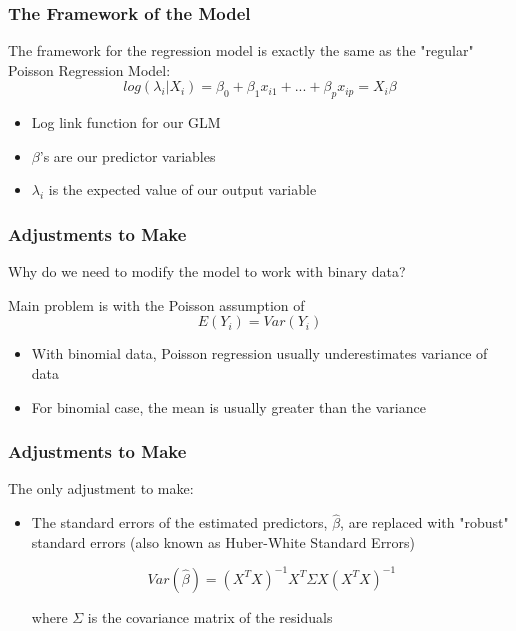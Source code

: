\documentclass{beamer}
\begin{document}
\begin{frame}[fragile]\frametitle{The Framework of the Model}
	
	The framework for the regression model is exactly the same as the "regular" Poisson Regression Model:
	$$ log(\lambda_i|X_i) = \beta_0 + \beta_1 x_{i1} + ... + \beta_p x_{ip} = X_i \beta $$  

	\begin{itemize}
	
		\item Log link function for our GLM
		
		\item $\beta$'s are our predictor variables	
		
		\item $\lambda_i$ is the expected value of our output variable
	
	\end{itemize}

\end{frame}



\begin{frame}[fragile]\frametitle{Adjustments to Make}

	Why do we need to modify the model to work with binary data?

	Main problem is with the Poisson assumption of 	
	$$ E(Y_i) = Var(Y_i) $$ 
	\begin{itemize}

		\item With binomial data, Poisson regression usually underestimates variance of data
		
		\item For binomial case, the mean is usually greater than the variance
		
	\end{itemize}
	
\end{frame}



\begin{frame}[fragile]\frametitle{Adjustments to Make}
	
	The only adjustment to make:	
	
	\begin{itemize}
		
		\item The standard errors of the estimated predictors, $\hat{\beta}$, are replaced with "robust" standard errors (also known as Huber-White Standard Errors) 
		
		$$ Var(\hat{\beta}) = (X^{T}X)^{-1}X^{T} \Sigma X(X^{T}X)^{-1} $$
		
		where $\Sigma$ is the covariance matrix of the residuals			
		
	\end{itemize}	
	
\end{frame}
\end{document}

